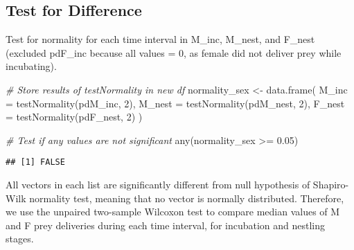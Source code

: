 \documentclass[
]{article}
\newenvironment{Shaded}{\begin{snugshade}}{\end{snugshade}}
\newcommand{\AttributeTok}[1]{\textcolor[rgb]{0.77,0.63,0.00}{#1}}
\newcommand{\CommentTok}[1]{\textcolor[rgb]{0.56,0.35,0.01}{\textit{#1}}}
\newcommand{\DecValTok}[1]{\textcolor[rgb]{0.00,0.00,0.81}{#1}}
\newcommand{\FloatTok}[1]{\textcolor[rgb]{0.00,0.00,0.81}{#1}}
\newcommand{\FunctionTok}[1]{\textcolor[rgb]{0.00,0.00,0.00}{#1}}
\newcommand{\NormalTok}[1]{#1}
\newcommand{\OtherTok}[1]{\textcolor[rgb]{0.56,0.35,0.01}{#1}}
\newcommand{\SpecialCharTok}[1]{\textcolor[rgb]{0.00,0.00,0.00}{#1}}
\begin{document}
\hypertarget{test-for-difference}{%
\subsection{Test for Difference}\label{test-for-difference}}

Test for normality for each time interval in M\_inc, M\_nest, and
F\_nest (excluded pdF\_inc because all values = 0, as female did not
deliver prey while incubating).

\begin{Shaded}
\begin{Highlighting}[]
\CommentTok{\# Store results of testNormality in new df}
\NormalTok{normality\_sex }\OtherTok{\textless{}{-}} \FunctionTok{data.frame}\NormalTok{(}
  \AttributeTok{M\_inc =} \FunctionTok{testNormality}\NormalTok{(pdM\_inc, }\DecValTok{2}\NormalTok{), }
  \AttributeTok{M\_nest =} \FunctionTok{testNormality}\NormalTok{(pdM\_nest, }\DecValTok{2}\NormalTok{), }
  \AttributeTok{F\_nest =} \FunctionTok{testNormality}\NormalTok{(pdF\_nest, }\DecValTok{2}\NormalTok{)}
\NormalTok{  )}

\CommentTok{\# Test if any values are not significant}
\FunctionTok{any}\NormalTok{(normality\_sex }\SpecialCharTok{\textgreater{}=} \FloatTok{0.05}\NormalTok{)}
\end{Highlighting}
\end{Shaded}

\begin{verbatim}
## [1] FALSE
\end{verbatim}

All vectors in each list are significantly different from null
hypothesis of Shapiro-Wilk normality test, meaning that no vector is
normally distributed. Therefore, we use the unpaired two-sample Wilcoxon
test to compare median values of M and F prey deliveries during each
time interval, for incubation and nestling stages.

\begin{Shaded}
\end{Shaded}
\end{document}
